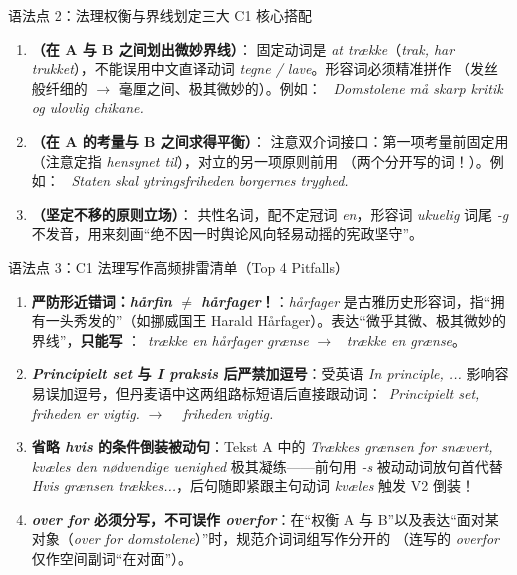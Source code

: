 \begin{grammatikbox}{语法点 2：法理权衡与界线划定三大 C1 核心搭配}
\begin{enumerate}
  \item \textbf{（在 A 与 B 之间划出微妙界线）}：\newline
    固定动词是 \textit{at trække}（\textit{trak, har trukket}），不能误用中文直译动词 \textit{tegne / lave}。形容词必须精准拼作 （发丝般纤细的 $\rightarrow$ 毫厘之间、极其微妙的）。例如：\newline
    \ \textit{Domstolene må  skarp kritik og ulovlig chikane.}
  \item \textbf{（在 A 的考量与 B 之间求得平衡）}：\newline
    注意双介词接口：第一项考量前固定用 （注意定指 \textit{hensynet til}），对立的另一项原则前用 （两个分开写的词！）。例如：\newline
    \ \textit{Staten skal  ytringsfriheden  borgernes tryghed.}
  \item \textbf{（坚定不移的原则立场）}：\newline
    共性名词，配不定冠词 \textit{en}，形容词 \textit{ukuelig} 词尾 \textit{-g} 不发音，用来刻画“绝不因一时舆论风向轻易动摇的宪政坚守”。
\end{enumerate}
\end{grammatikbox}

\begin{grammatikbox}{语法点 3：C1 法理写作高频排雷清单（Top 4 Pitfalls）}
\begin{enumerate}
  \item \textbf{ 严防形近错词：\textit{hårfin} $\neq$ \textit{hårfager}！}：\textit{hårfager} 是古雅历史形容词，指“拥有一头秀发的”（如挪威国王 Harald Hårfager）。表达“微乎其微、极其微妙的界线”，\textbf{只能写 }：\ \textit{trække en hårfager grænse} $\rightarrow$ \ \textit{trække en  grænse}。
  \item \textbf{ \textit{Principielt set} 与 \textit{I praksis} 后严禁加逗号}：受英语 \textit{In principle, ...} 影响容易误加逗号，但丹麦语中这两组路标短语后直接跟动词：\ \textit{Principielt set, friheden er vigtig.} $\rightarrow$ \ \textit{ friheden vigtig.}
  \item \textbf{ 省略 \textit{hvis} 的条件倒装被动句}：Tekst A 中的 \textit{Trækkes grænsen for snævert, kvæles den nødvendige uenighed} 极其凝练——前句用 \textit{-s} 被动动词放句首代替 \textit{Hvis grænsen trækkes...}，后句随即紧跟主句动词 \textit{kvæles} 触发 V2 倒装！
  \item \textbf{ \textit{over for} 必须分写，不可误作 \textit{overfor}}：在“权衡 A 与 B”以及表达“面对某对象（\textit{over for domstolene}）”时，规范介词词组写作分开的 （连写的 \textit{overfor} 仅作空间副词“在对面”）。
\end{enumerate}
\end{grammatikbox}

